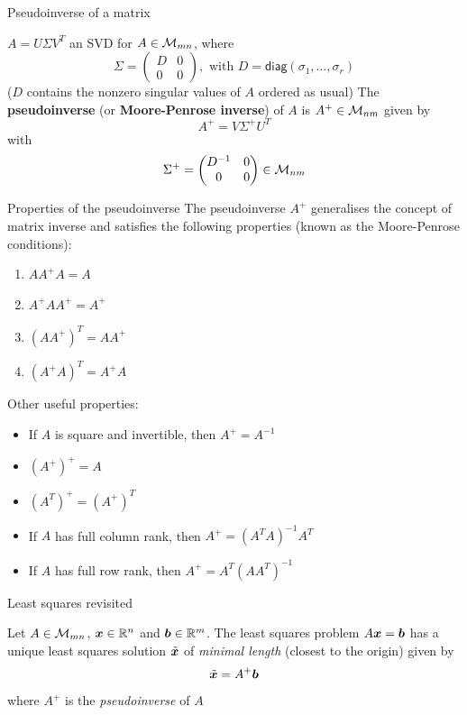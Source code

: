 \documentclass[aspectratio=169]{beamer}\usepackage[]{graphicx}\usepackage[]{xcolor}
\begin{document}


\begin{frame}{Pseudoinverse of a matrix}
\begin{definition}[Pseudoinverse]
$A=U\Sigma V^T$ an SVD for $A\in\mathcal{M}_{mn}$, where 
\[
\Sigma = \begin{pmatrix}
D & 0 \\ 0 & 0
\end{pmatrix},
\textrm{ with }
D=\mathsf{diag}(\sigma_1,\ldots,\sigma_r)
\]
($D$ contains the nonzero singular values of $A$ ordered as usual)
\vskip0.5cm
The \textbf{pseudoinverse} (or \textbf{Moore-Penrose inverse}) of $A$ is $A^+\in\mathcal{M}_{nm}$ given by
\[
A^+ = V\Sigma^+ U^T
\]
with
\[
\Sigma^+ =
\begin{pmatrix}
D^{-1} & 0 \\ 0 & 0
\end{pmatrix}\in\mathcal{M}_{nm}
\]
\end{definition}
\end{frame}


\begin{frame}{Properties of the pseudoinverse}
The pseudoinverse $A^+$ generalises the concept of matrix inverse and satisfies the following properties (known as the Moore-Penrose conditions):
\begin{enumerate}
\item $AA^+A = A$
\item $A^+AA^+ = A^+$
\item $(AA^+)^T = AA^+$
\item $(A^+A)^T = A^+A$
\end{enumerate}
\vfill
Other useful properties:
\begin{itemize}
\item If $A$ is square and invertible, then $A^+ = A^{-1}$
\item $(A^+)^+ = A$
\item $(A^T)^+ = (A^+)^T$
\item If $A$ has full column rank, then $A^+ = (A^TA)^{-1}A^T$
\item If $A$ has full row rank, then $A^+ = A^T(AA^T)^{-1}$
\end{itemize}
\end{frame}



\begin{frame}{Least squares revisited}
\begin{importanttheorem}
Let $A\in\mathcal{M}_{mn}$, $\bm{x}\in\mathbb{R}^n$ and $\bm{b}\in\mathbb{R}^m$. The least squares problem $A\bm{x}=\bm{b}$ has a unique least squares solution $\tilde{\bm{x}}$ of \emph{minimal length} (closest to the origin) given by
\[
\tilde{\bm{x}} = A^+\bm{b}
\]
where $A^+$ is the \emph{pseudoinverse} of $A$
\end{importanttheorem}
\end{frame}
\end{document}
